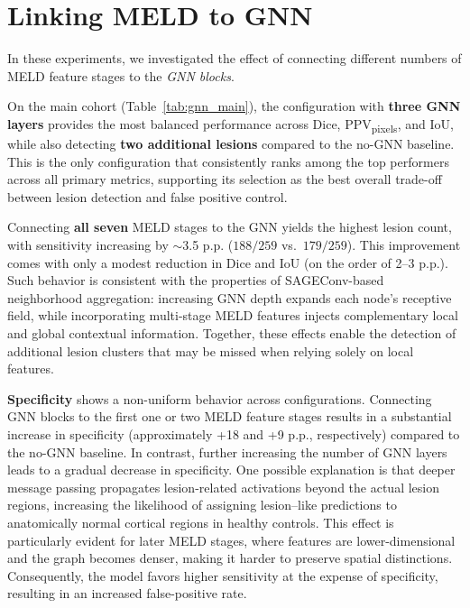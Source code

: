 \documentclass[FCD_GNN.tex]{subfiles}
\begin{document}


\clearpage
\section{Linking MELD to GNN}
In these experiments, we investigated the effect of connecting different numbers of MELD feature stages to the \textit{GNN blocks}.

On the main cohort (Table~\ref{tab:gnn_main}), the configuration with \textbf{three GNN layers} provides the most balanced performance across Dice, PPV\textsubscript{pixels}, and IoU, while also detecting \textbf{two additional lesions} compared to the no-GNN baseline.
This is the only configuration that consistently ranks among the top performers across all primary metrics, supporting its selection as the best overall trade-off between lesion detection and false positive control.

Connecting \textbf{all seven} MELD stages to the GNN yields the highest lesion count, with sensitivity increasing by $\sim$3.5 \ac{p.p.} (\(188/259\) vs.\ \(179/259\)).
This improvement comes with only a modest reduction in Dice and IoU (on the order of 2--3 \ac{p.p.}).
Such behavior is consistent with the properties of SAGEConv-based neighborhood aggregation: increasing GNN depth expands each node’s receptive field, while incorporating multi-stage MELD features injects complementary local and global contextual information.
Together, these effects enable the detection of additional lesion clusters that may be missed when relying solely on local features.

\textbf{Specificity} shows a non-uniform behavior across configurations.
Connecting GNN blocks to the first one or two MELD feature stages results in a substantial increase in specificity (approximately +18 and +9 \ac{p.p.}, respectively) compared to the no-GNN baseline.
In contrast, further increasing the number of GNN layers leads to a gradual decrease in specificity.
One possible explanation is that deeper message passing propagates lesion-related activations beyond the actual lesion regions, increasing the likelihood of assigning lesion--like predictions to anatomically normal cortical regions in healthy controls.
This effect is particularly evident for later MELD stages, where features are lower-dimensional and the graph becomes denser, making it harder to preserve spatial distinctions.
Consequently, the model favors higher sensitivity at the expense of specificity, resulting in an increased false-positive rate.
\end{document}
